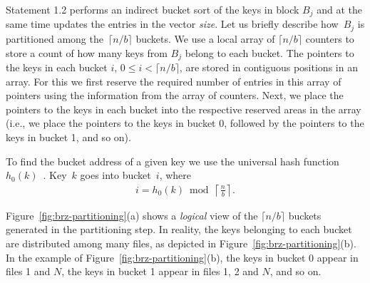 Statement 1.2 performs an indirect bucket sort of the keys in block $B_j$
and at the same time updates the entries in the vector {\em size}.
Let us briefly describe how~$B_j$ is partitioned among the~$\lceil n/b\rceil$
buckets. 
We use a local array of $\lceil n/b \rceil$ counters to store a 
count of how many keys from $B_j$ belong to each bucket.
The pointers to the keys in each bucket $i$, $0 \leq i < \lceil n/b \rceil$,
are stored in contiguous positions in an array.
For this we first reserve the required number of entries
in this array of pointers using the information from the array of counters. 
Next, we place the pointers to the keys in each bucket into the respective
reserved areas in the array (i.e., we place the pointers to the keys in bucket 0, 
followed by the pointers to the keys in bucket 1, and so on).

\enlargethispage{2\baselineskip}
To find the bucket address of a given key
we use the universal hash function $h_0(k)$~\cite{j97}.
Key~$k$ goes into bucket~$i$, where
\begin{eqnarray} \label{eq:bucketindex}
i=h_0(k) \bmod \left \lceil \frac{n}{b} \right \rceil.
\end{eqnarray}

Figure~\ref{fig:brz-partitioning}(a) shows a \emph{logical} view of the
$\lceil n/b \rceil$ buckets generated in the partitioning step.
In reality, the keys belonging to each bucket are distributed among many files,
as depicted in Figure~\ref{fig:brz-partitioning}(b).
In the example of Figure~\ref{fig:brz-partitioning}(b), the keys in bucket 0 
appear in files 1 and $N$, the keys in bucket 1 appear in files 1, 2
and $N$, and so on. 


